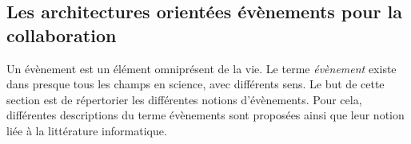 %
%
%

\subsection{Les architectures orientées évènements pour la collaboration}
Un évènement est un élément omniprésent de la vie. Le terme \textit{évènement} 
existe dans presque tous les champs en science, avec différents sens. Le but de 
cette section est de répertorier les différentes notions d'évènements. Pour cela, 
différentes descriptions du terme évènements sont proposées ainsi que leur notion 
liée à la littérature informatique. 

